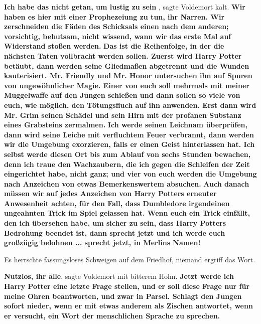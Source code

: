 \glqq{}\textbf{Ich habe das nicht getan, um lustig zu sein\grqq{}} , sagte
Voldemort kalt. \glqq{}\textbf{Wir haben es hier mit einer Prophezeiung zu tun,
ihr Narren. Wir zerschneiden die Fäden des Schicksals einen nach dem anderen;
vorsichtig, behutsam, nicht wissend, wann wir das erste Mal auf Widerstand
stoßen werden.} \textbf{ Das ist die Reihenfolge, in der die nächsten Taten
vollbracht werden sollen. Zuerst wird Harry Potter betäubt, dann werden seine
Gliedmaßen abgetrennt und die Wunden kauterisiert. Mr. Friendly und Mr. Honor
untersuchen ihn auf Spuren von ungewöhnlicher Magie. Einer von euch soll
mehrmals mit meiner Muggelwaffe auf den Jungen schießen und dann sollen so viele
von euch, wie möglich, den Tötungsfluch auf ihn anwenden. Erst dann wird Mr.
Grim seinen Schädel und sein Hirn mit der profanen Substanz eines Grabsteins
zermalmen.} \textbf{ Ich werde seinen Leichnam überprüfen, dann wird seine
Leiche mit verfluchtem Feuer verbrannt, dann werden wir die Umgebung exorzieren,
falls er einen Geist hinterlassen hat. Ich selbst werde diesen Ort bis zum
Ablauf von sechs Stunden bewachen, denn ich traue den Wachzaubern, die ich gegen
die Schleifen der Zeit eingerichtet habe, nicht ganz; und vier von euch werden
die Umgebung nach Anzeichen von etwas Bemerkenswertem absuchen.} \textbf{ Auch
danach müssen wir auf jedes Anzeichen von Harry Potters erneuter Anwesenheit
achten, für den Fall, dass Dumbledore irgendeinen ungeahnten Trick im Spiel
gelassen hat. Wenn euch ein Trick einfällt, den ich übersehen habe, um sicher zu
sein, dass Harry Potters Bedrohung beendet ist, dann sprecht jetzt und ich werde
euch großzügig belohnen ... sprecht jetzt, in Merlins Namen!}\grqq{}

Es herrschte fassungsloses Schweigen auf dem Friedhof, niemand ergriff das Wort.

\glqq{}\textbf{Nutzlos, ihr alle}\grqq{}, sagte Voldemort mit bitterem Hohn.
\glqq{}\textbf{Jetzt werde ich Harry Potter eine letzte Frage stellen, und er
soll diese Frage nur für meine Ohren beantworten, und zwar in Parsel. Schlagt
den Jungen sofort nieder, wenn er mit etwas anderem als Zischen antwortet, wenn
er versucht, ein Wort der menschlichen Sprache zu sprechen.}\grqq{}

